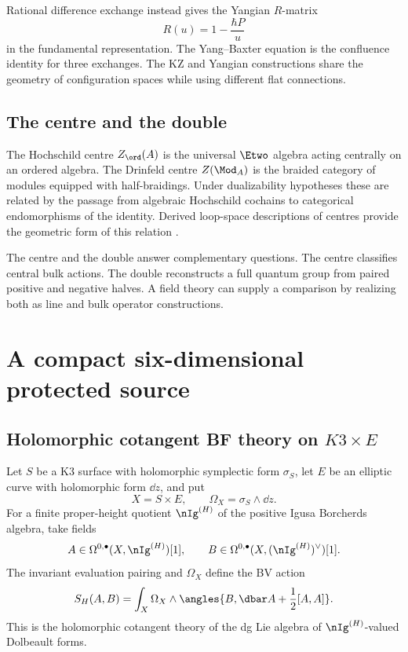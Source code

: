 Rational difference exchange instead gives the Yangian $R$-matrix
\[
 R(u)=1-\frac{\hbar P}{u}
\]
in the fundamental representation. The Yang--Baxter equation is the confluence identity for three exchanges. The KZ and Yangian constructions share the geometry of configuration spaces while using different flat connections.

\chapter{The centre and the double}
The Hochschild centre $Z_{\ord}(A)$ is the universal $\Etwo$ algebra acting centrally on an ordered algebra. The Drinfeld centre $Z(\Mod_A)$ is the braided category of modules equipped with half-braidings. Under dualizability hypotheses these are related by the passage from algebraic Hochschild cochains to categorical endomorphisms of the identity. Derived loop-space descriptions of centres provide the geometric form of this relation \cite{BenZviFrancisNadler}.

The centre and the double answer complementary questions. The centre classifies central bulk actions. The double reconstructs a full quantum group from paired positive and negative halves. A field theory can supply a comparison by realizing both as line and bulk operator constructions.


\part{A compact six-dimensional protected source}

\chapter{Holomorphic cotangent BF theory on \texorpdfstring{$K3\times E$}{K3 x E}}
Let $S$ be a K3 surface with holomorphic symplectic form $\sigma_S$, let $E$ be an elliptic curve with holomorphic form $\dd z$, and put
\[
 X=S\times E,
 \qquad
 \Omega_X=\sigma_S\wedge\dd z.
\]
For a finite proper-height quotient $\nIg^{(H)}$ of the positive Igusa Borcherds algebra, take fields
\[
 A\in\Omega^{0,\bullet}(X,\nIg^{(H)})[1],
 \qquad
 B\in\Omega^{0,\bullet}(X,(\nIg^{(H)})^\vee)[1].
\]
The invariant evaluation pairing and $\Omega_X$ define the BV action
\begin{equation}\label{eq:vol4-compact-hbf}
 S_H(A,B)=
 \int_X\Omega_X\wedge
 \angles{B,\dbar A+\frac12[A,A]}.
\end{equation}
This is the holomorphic cotangent theory of the dg Lie algebra of $\nIg^{(H)}$-valued Dolbeault forms.

